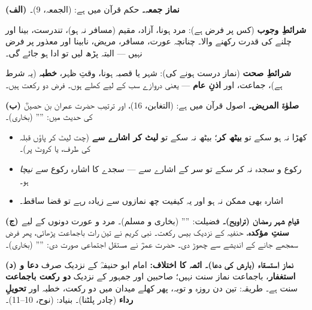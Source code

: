 \begin{hal}
\textbf{(الف) نماز جمعہ۔} حکم قرآن میں ہے:  (الجمعہ، \textenglish{9})۔

\smallskip
\textbf{شرائطِ وجوب} (کس پر فرض ہے): مرد ہونا، آزاد، مقیم (مسافر نہ ہو)، تندرست،
بینا اور چلنے کی قدرت رکھنے والا۔ چنانچہ عورت، مسافر، مریض، نابینا اور معذور پر
فرض نہیں --- البتہ پڑھ لیں تو ادا ہو جائے گی۔

\smallskip
\textbf{شرائطِ صحت} (نماز درست ہونے کی): شہر یا قصبہ ہونا، وقتِ ظہر، \textbf{خطبہ}
(یہ شرط ہے)، جماعت، اور \textbf{اذنِ عام} --- یعنی دروازے سب کے لیے کھلے ہوں۔ فرض
دو رکعت ہیں۔

\medskip
\textbf{(ب) صلوٰۃ المریض۔} اصول قرآن میں ہے:  (التغابن، \textenglish{16})، اور ترتیب حضرت عمران بن حصینؓ کی
حدیث میں: '''' (بخاری)۔

\begin{itemize}\setlength{\itemsep}{1pt}
  \item کھڑا نہ ہو سکے تو \textbf{بیٹھ کر}؛ بیٹھ نہ سکے تو \textbf{لیٹ کر
        اشارے سے} (چت لیٹ کر پاؤں قبلہ کی طرف، یا کروٹ پر)۔
  \item رکوع و سجدہ نہ کر سکے تو سر کے اشارے سے --- سجدے کا اشارہ رکوع سے
        \emph{نیچا} ہو۔
  \item اشارہ بھی ممکن نہ ہو اور یہ کیفیت چھ نمازوں سے زیادہ رہے تو قضا ساقط۔
\end{itemize}

\medskip
\textbf{(ج) قیامِ شہر رمضان (تراویح)۔} فضیلت: '''' (بخاری و
مسلم)۔ مرد و عورت دونوں کے لیے \textbf{سنتِ مؤکدہ}، حنفیہ کے نزدیک بیس رکعت۔
نبی کریم \saw نے تین رات باجماعت پڑھائی، پھر فرض سمجھے جانے کے اندیشے سے چھوڑ
دی۔ حضرت عمرؓ نے مستقل اجتماعی صورت دی: ''''
(بخاری)۔

\medskip
\textbf{(د) نماز استسقاء (بارش کی دعا)۔} \textbf{ائمہ کا اختلاف:} امام ابو
حنیفہؒ کے نزدیک صرف \textbf{دعا و استغفار}، باجماعت نماز سنت نہیں؛ صاحبین اور
جمہور کے نزدیک \textbf{دو رکعت باجماعت} سنت ہے۔ طریقہ: تین دن روزہ و توبہ، پھر
کھلے میدان میں دو رکعت، خطبہ اور \textbf{تحویلِ رداء} (چادر پلٹنا)۔ بنیاد:
 (نوح، \textenglish{10--11})۔


\end{hal}
